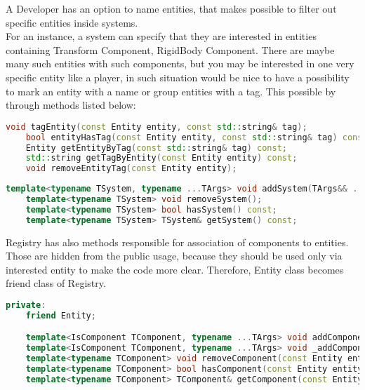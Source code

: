 A Developer has an option to name entities, that makes possible to filter out specific entities inside systems.\\
For an instance, a system can specify that they are interested in entities containing Transform Component, RigidBody Component. There are maybe many such entities with such components, but you may be interested in one very specific entity like a player, in such situation would be nice to have a possibility to mark an entity with a name or group entities with a tag. This possible by through methods listed below:   
\begin{lstlisting}[language=c++, caption=Registry tag and group methods (./engine/include/tsengine/ecs/ecs.h)]
    void tagEntity(const Entity entity, const std::string& tag);
    bool entityHasTag(const Entity entity, const std::string& tag) const;
    Entity getEntityByTag(const std::string& tag) const;
    std::string getTagByEntity(const Entity entity) const;
    void removeEntityTag(const Entity entity);
\end{lstlisting}

\begin{lstlisting}[language=c++, caption=Registry system methods (./engine/include/tsengine/ecs/ecs.h)]
    template<typename TSystem, typename ...TArgs> void addSystem(TArgs&& ...args);
    template<typename TSystem> void removeSystem();
    template<typename TSystem> bool hasSystem() const;
    template<typename TSystem> TSystem& getSystem() const;
\end{lstlisting}

Registry has also methods responsible for association of components to entities.
Those are hidden from the public usage, because they should be used only via interested entity to make the code more clear. Therefore, Entity class becomes friend class of Registry. 
\begin{lstlisting}[language=c++, caption=Registry component addition methods (./engine/include/tsengine/ecs/ecs.h)]
private:
    friend Entity;

    template<IsComponent TComponent, typename ...TArgs> void addComponent(const Entity entity, TArgs&& ...args);
    template<IsComponent TComponent, typename ...TArgs> void _addComponent(const Entity entity, TArgs&& ...args);
    template<typename TComponent> void removeComponent(const Entity entity);
    template<typename TComponent> bool hasComponent(const Entity entity) const;
    template<typename TComponent> TComponent& getComponent(const Entity entity) const;
\end{lstlisting}

